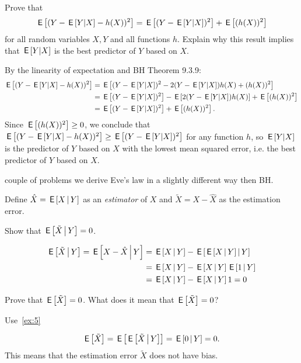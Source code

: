 \begin{exercise}
Prove that
\begin{equation}
  \label{eq:21}
\E{(Y - \E{Y|X} - h(X))^2} = \E{(Y - \E{Y|X})^2} + \E{(h(X))^2}
\end{equation}
for all random variables $X, Y$ and all functions $h$. Explain why this result implies that  $\,\mathsf{E}\left[Y|X\right]$ is the best predictor of $Y$ based on $X$.
\begin{solution}
By the linearity of expectation and BH Theorem 9.3.9:
\begin{align*}
\,\mathsf{E}\left[(Y - \,\mathsf{E}\left[Y|X\right] - h(X))^2\right] &= \,\mathsf{E}\left[(Y - \,\mathsf{E}\left[Y|X\right])^2 - 2(Y - \,\mathsf{E}\left[Y|X\right])h(X) + (h(X))^2\right]
\\ &= \,\mathsf{E}\left[(Y - \,\mathsf{E}\left[Y|X\right])^2\right] - \,\mathsf{E}\left[2(Y - \,\mathsf{E}\left[Y|X\right])h(X)\right] + \,\mathsf{E}\left[(h(X))^2\right]
\\ &= \,\mathsf{E}\left[(Y - \,\mathsf{E}\left[Y|X\right])^2\right] + \,\mathsf{E}\left[(h(X))^2\right].
\end{align*}
Since $\,\mathsf{E}\left[(h(X))^2\right] \geq 0$, we conclude that $\,\mathsf{E}\left[(Y - \,\mathsf{E}\left[Y|X\right] - h(X))^2\right] \geq \,\mathsf{E}\left[(Y - \,\mathsf{E}\left[Y|X\right])^2\right]$ for any function $h$, so $\,\mathsf{E}\left[Y|X\right]$ is the predictor of $Y$ based on $X$ with the lowest mean squared error, i.e. the best predictor of $Y$ based on $X$.
\end{solution}
\end{exercise}



 couple of problems we derive Eve's law in a slightly different way then BH.

Define $\hat X = \,\mathsf{E}\left[X\,\middle|\, Y\right]$ as an \emph{estimator} of $X$ and $\tilde X = X - \hat X$ as the estimation error.

\begin{exercise}\label{ex:5}
Show that $\,\mathsf{E}\left[\tilde X\,\middle|\, Y\right] = 0$.
\begin{solution}
\begin{align}
\label{eq:4}
\E{\tilde X \given Y} = \E{X - \hat X \given Y} &=
\E{X\given Y}  - \E{ \E{X\given Y}\given Y}  \\
&=\E{X\given Y}  -  \E{X\given Y}\E{1\given Y}  \\
&=\E{X\given Y}  -  \E{X\given Y}1 = 0
\end{align}
\end{solution}
\end{exercise}

\begin{exercise}\label{ex:4}
Prove that $\,\mathsf{E}\left[\tilde X\right] = 0$. What does it mean that $\,\mathsf{E}\left[\tilde X\right] =0$?
\begin{hint}
  Use~\cref{ex:5}
\end{hint}
\begin{solution}
\begin{equation}
\label{eq:5}
\E{\tilde X} = \E{\E{\tilde X\given Y}} = \E{ 0 \given Y} =0.
\end{equation}
This means that the estimation error $\tilde X$ does not have bias.
\end{solution}
\end{exercise}


